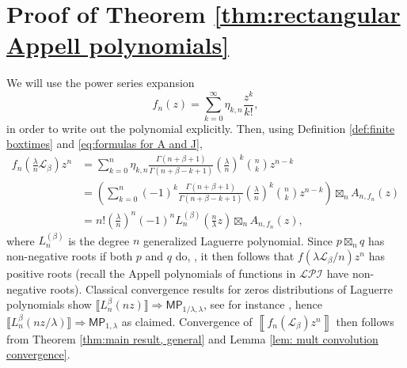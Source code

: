 \documentclass[reqno]{amsart}
\newcommand{\1}{\mathbf{1}}
\theoremstyle{plain}
\theoremstyle{definition}
\theoremstyle{remark}
\numberwithin{equation}{section}
\begin{document}
	\section{Proof of Theorem \ref{thm:rectangular Appell polynomials}}   We will use the power series expansion \begin{equation}
		f_{n}(z)=\sum_{k=0}^{\infty}\eta_{k,n}\frac{z^k}{k!},
	\end{equation} in order to write out the polynomial explicitly. Then, using Definition \ref{def:finite boxtimes} and \eqref{eq:formulas for A and J},	
	\begin{equation}\label{eq:decomp of finite rect inf div}
	\begin{aligned}
		f_n\left(\frac{\lambda}{n}\mathscr{L}_{\beta}\right)z^{n}&=\sum_{k=0}^{n}\eta_{k,n}\frac{\Gamma(n+\beta+1)}{\Gamma(n+\beta-k+1)}\left(\frac{\lambda}{n}\right)^k\binom{n}{k}z^{n-k}\\
		&=\left(\sum_{k=0}^{n}(-1)^{k}\frac{\Gamma(n+\beta+1)}{\Gamma(n+\beta-k+1)}\left(\frac{\lambda}{n}\right)^k\binom{n}{k}z^{n-k}\right)\boxtimes_{n} A_{n,f_n}(z)\\
		&=n!\left(\frac{\lambda}{n}\right)^n(-1)^{n}L_{n}^{(\beta)}\left(\frac{n}{\lambda}z\right)\boxtimes_{n} A_{n,f_n}(z),
	\end{aligned}
	\end{equation} where $L_{n}^{(\beta)}$ is the degree $n$ generalized Laguerre polynomial. Since $p\boxtimes_{n}q$ has non-negative roots if both $p$ and $q$ do, \cite[Theorem 1.16]{Marcus-Spielman-Srivastava2022}, it then follows that $f(\lambda \mathscr{L}_{\beta}/n)z^n$ has positive roots (recall the Appell polynomials of functions in $\mathcal{LPI}$ have non-negative roots). Classical convergence results for zeros distributions of Laguerre polynomials show $\llbracket L_n^{\beta}(nz)\rrbracket\Rightarrow \mathsf{MP}_{1/\lambda,\lambda}$, see for instance \cite[Corollary 4.14]{Jalowy-Kabluchko-Marynych2025part2}, hence $\llbracket L_n^{\beta}(nz/ \lambda)\rrbracket\Rightarrow \mathsf{MP}_{1,\lambda}$ as claimed.  Convergence of $\left\llbracket f_{n}(\mathscr{L}_{\beta})z^{n}\right\rrbracket$ then follows from Theorem \ref{thm:main result, general} and Lemma \ref{lem: mult convolution convergence}.  
	
\end{document}

